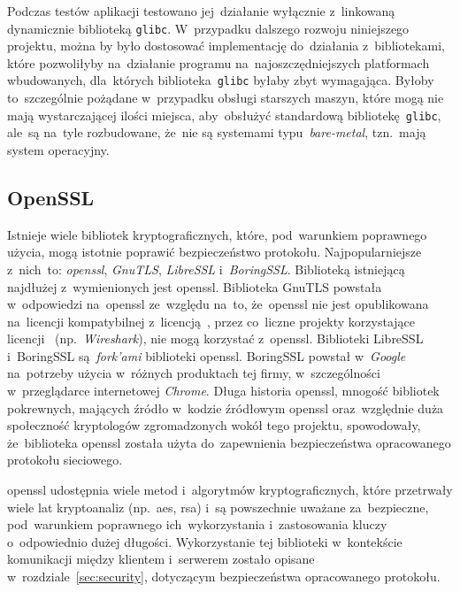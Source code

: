 \documentclass[thesis]{subfiles}
\begin{document}
Podczas testów aplikacji testowano jej~działanie wyłącznie z~linkowaną dynamicznie biblioteką \texttt{glibc}. W~przypadku dalszego rozwoju niniejszego projektu, można by było dostosować implementację do~działania z~bibliotekami, które pozwoliłyby na~działanie programu na~najoszczędniejszych platformach wbudowanych, dla~których biblioteka~\texttt{glibc} byłaby zbyt wymagająca. Byłoby to~szczególnie pożądane w~przypadku obsługi starszych maszyn, które mogą nie mają wystarczającej ilości miejsca, aby~obsłużyć standardową bibliotekę~\texttt{glibc}, ale~są na~tyle rozbudowane, że~nie są systemami typu~\emph{bare-metal}, tzn.~mają system operacyjny.


\subsection{OpenSSL}

Istnieje wiele bibliotek kryptograficznych, które, pod~warunkiem poprawnego użycia, mogą istotnie poprawić bezpieczeństwo protokołu. Najpopularniejsze z~nich~to: \emph{\gls{openssl}}, \emph{GnuTLS}, \emph{LibreSSL} i~\emph{BoringSSL}. Biblioteką istniejącą najdłużej z~wymienionych jest \gls{openssl}. Biblioteka GnuTLS powstała w~odpowiedzi na~\gls{openssl} ze~względu na~to, że~\gls{openssl} nie jest opublikowana na~licencji kompatybilnej z~licencją~, przez co~liczne projekty korzystające licencji~ (np.~\emph{Wireshark}), nie mogą korzystać z~\gls{openssl}. Biblioteki LibreSSL i~BoringSSL są~\emph{fork'ami} biblioteki \gls{openssl}. BoringSSL powstał w~\emph{Google} na~potrzeby użycia w~różnych produktach tej firmy, w~szczególności w~przeglądarce internetowej \emph{Chrome}. Długa historia \gls{openssl}, mnogość bibliotek pokrewnych, mających źródło w~kodzie źródłowym \gls{openssl} oraz~względnie duża społeczność kryptologów zgromadzonych wokół tego projektu, spowodowały, że~biblioteka \gls{openssl} została użyta do~zapewnienia bezpieczeństwa opracowanego protokołu sieciowego.

\gls{openssl} udostępnia wiele metod i~algorytmów kryptograficznych, które przetrwały wiele lat kryptoanaliz (np.~\gls{aes}, \gls{rsa}) i~są powszechnie uważane za~bezpieczne, pod~warunkiem poprawnego ich~wykorzystania i~zastosowania kluczy o~odpowiednio dużej długości. Wykorzystanie tej biblioteki w~kontekście komunikacji między klientem i~serwerem zostało opisane w~rozdziale~\ref{sec:security}, dotyczącym bezpieczeństwa opracowanego protokołu.
\end{document}
